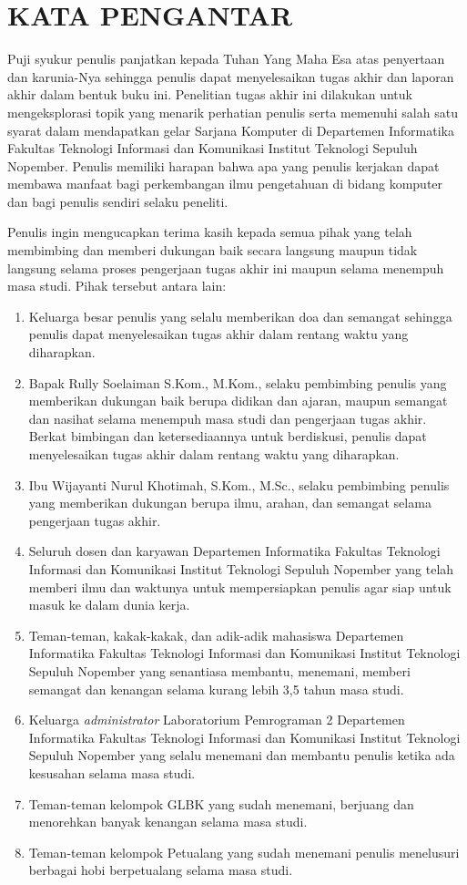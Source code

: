 \chapter {KATA PENGANTAR}

Puji syukur penulis panjatkan kepada Tuhan Yang Maha Esa atas penyertaan dan karunia-Nya sehingga penulis dapat menyelesaikan tugas akhir dan laporan akhir dalam bentuk buku ini. Penelitian tugas akhir ini dilakukan untuk mengeksplorasi topik yang menarik perhatian penulis serta memenuhi salah satu syarat dalam mendapatkan gelar Sarjana Komputer di Departemen Informatika Fakultas Teknologi Informasi dan Komunikasi Institut Teknologi Sepuluh Nopember. Penulis memiliki harapan bahwa apa yang penulis kerjakan dapat membawa manfaat bagi perkembangan ilmu pengetahuan di bidang komputer dan bagi penulis sendiri selaku peneliti.

Penulis ingin mengucapkan terima kasih kepada semua pihak yang telah membimbing dan memberi dukungan baik secara langsung maupun tidak langsung selama proses pengerjaan tugas akhir ini maupun selama menempuh masa studi. Pihak tersebut antara lain:

\begin {enumerate}
	\item Keluarga besar penulis yang selalu memberikan doa dan semangat sehingga penulis dapat menyelesaikan tugas akhir dalam rentang waktu yang diharapkan.
	\item Bapak Rully Soelaiman S.Kom., M.Kom., selaku pembimbing penulis yang memberikan dukungan baik berupa didikan dan ajaran, maupun semangat dan nasihat selama menempuh masa studi dan pengerjaan tugas akhir. Berkat bimbingan dan ketersediaannya untuk berdiskusi, penulis dapat menyelesaikan tugas akhir dalam rentang waktu yang diharapkan.
	\item Ibu Wijayanti Nurul Khotimah, S.Kom., M.Sc., selaku pembimbing penulis yang memberikan dukungan berupa ilmu, arahan, dan semangat selama pengerjaan tugas akhir.
	\item Seluruh dosen dan karyawan Departemen Informatika Fakultas Teknologi Informasi dan Komunikasi Institut Teknologi Sepuluh Nopember yang telah memberi ilmu dan waktunya untuk mempersiapkan penulis agar siap untuk masuk ke dalam dunia kerja. 
	\item Teman-teman, kakak-kakak, dan adik-adik mahasiswa Departemen Informatika Fakultas Teknologi Informasi dan Komunikasi Institut Teknologi Sepuluh Nopember yang senantiasa membantu, menemani, memberi semangat dan kenangan selama kurang lebih 3,5 tahun masa studi.
	\item Keluarga \textit{administrator} Laboratorium Pemrograman 2 Departemen Informatika Fakultas Teknologi Informasi dan Komunikasi Institut Teknologi Sepuluh Nopember yang selalu menemani dan membantu penulis ketika ada kesusahan selama masa studi.
	\item Teman-teman kelompok GLBK yang sudah menemani, berjuang dan menorehkan banyak kenangan selama masa studi.
	\item Teman-teman kelompok Petualang yang sudah menemani penulis menelusuri berbagai hobi berpetualang selama masa studi.
\end {enumerate}

